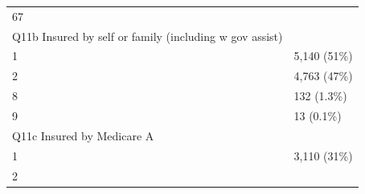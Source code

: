 \documentclass[]{article}
\begin{document}
\begin{longtable}[]{@{}ll@{}}
\begin{minipage}[t]{0.23\columnwidth}
67\strut
\end{minipage}\tabularnewline
\begin{minipage}[t]{0.71\columnwidth}\raggedright
Q11b Insured by self or family (including w gov assist)\strut
\end{minipage} & \begin{minipage}[t]{0.23\columnwidth}\raggedright
\strut
\end{minipage}\tabularnewline
\begin{minipage}[t]{0.71\columnwidth}\raggedright
1\strut
\end{minipage} & \begin{minipage}[t]{0.23\columnwidth}\raggedright
5,140 (51\%)\strut
\end{minipage}\tabularnewline
\begin{minipage}[t]{0.71\columnwidth}\raggedright
2\strut
\end{minipage} & \begin{minipage}[t]{0.23\columnwidth}\raggedright
4,763 (47\%)\strut
\end{minipage}\tabularnewline
\begin{minipage}[t]{0.71\columnwidth}\raggedright
8\strut
\end{minipage} & \begin{minipage}[t]{0.23\columnwidth}\raggedright
132 (1.3\%)\strut
\end{minipage}\tabularnewline
\begin{minipage}[t]{0.71\columnwidth}\raggedright
9\strut
\end{minipage} & \begin{minipage}[t]{0.23\columnwidth}\raggedright
13 (0.1\%)\strut
\end{minipage}\tabularnewline
\begin{minipage}[t]{0.71\columnwidth}\raggedright
Q11c Insured by Medicare A\strut
\end{minipage} & \begin{minipage}[t]{0.23\columnwidth}\raggedright
\strut
\end{minipage}\tabularnewline
\begin{minipage}[t]{0.71\columnwidth}\raggedright
1\strut
\end{minipage} & \begin{minipage}[t]{0.23\columnwidth}\raggedright
3,110 (31\%)\strut
\end{minipage}\tabularnewline
\begin{minipage}[t]{0.71\columnwidth}\raggedright
2\strut
\end{minipage} & \begin{minipage}[t]{0.23\columnwidth}\raggedright

\end{minipage}
\end{longtable}
\end{document}
